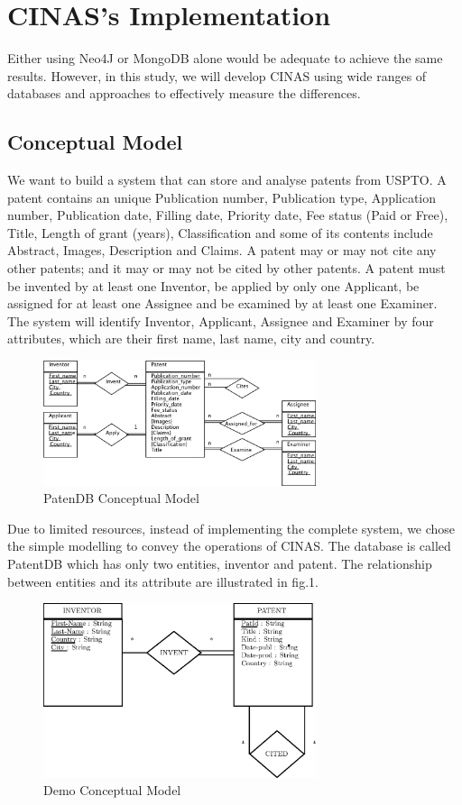 \documentclass{sig-alternate}
\begin{document}
{\section{CINAS's Implementation }

Either using Neo4J or MongoDB alone would be adequate to achieve the same results. However, in this study, we will develop CINAS using wide ranges of databases and approaches to effectively measure the differences.
\subsection{Conceptual Model}
We want to build a system that can store and analyse patents from USPTO. A patent contains an unique Publication number, Publication type, Application number, Publication date, Filling date, Priority date, Fee status (Paid or Free), Title, Length of grant (years), Classification and some of its contents include Abstract, Images, Description and Claims. A patent may or may not cite any other patents; and it may or may not be cited by other patents. A patent must be invented by at least one Inventor, be applied by only one Applicant, be assigned for at least one Assignee and be examined by at least one Examiner. The system will identify Inventor, Applicant, Assignee and Examiner by four attributes, which are their first name, last name, city and country.

\begin{figure}[htb]
\centering
\includegraphics[width=80mm,scale=10]{erd.png}
\caption{ PatenDB Conceptual Model}
\end{figure}

Due to limited resources, instead of implementing the complete system, we chose the simple modelling to convey the operations of CINAS. The database is called PatentDB which has only two entities, inventor and patent. The relationship between entities and its attribute are illustrated in fig.1. 

\begin{figure}[htb]
\centering
\includegraphics[width=80mm,scale=10]{conceptual_model.eps}
\caption{ Demo Conceptual Model}
\end{figure}

}
\end{document}
